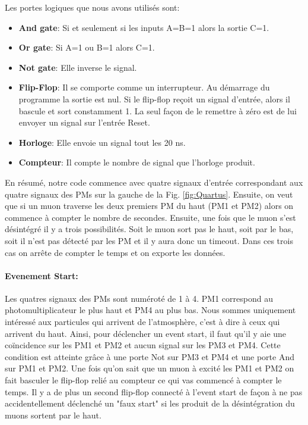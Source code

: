 \documentclass[12pt]{article}
\begin{document}
Les portes logiques que nous avons utilisés sont:
\begin{itemize}
    \item \textbf{And gate}: Si et seulement si les inputs A=B=1 alors la sortie C=1.
    \item \textbf{Or gate}: Si A=1 ou B=1 alors C=1.
    \item \textbf{Not gate}: Elle inverse le signal.
    \item \textbf{Flip-Flop}: Il se comporte comme un interrupteur. Au démarrage du programme la sortie est nul. Si le flip-flop reçoit un signal d'entrée, alors il bascule et sort constamment 1. La seul façon de le remettre à zéro est de lui envoyer un signal sur l'entrée Reset.
    \item \textbf{Horloge}: Elle envoie un signal tout les 20 ns.
    \item \textbf{Compteur}: Il compte le nombre de signal que l'horloge produit.
\end{itemize}

En résumé, notre code commence avec quatre signaux d'entrée correspondant aux quatre signaux des PMs sur la gauche de la Fig. \ref{fig:Quartus}. Ensuite, on veut que si un muon traverse les deux premiers PM du haut (PM1 et PM2) alors on commence à compter le nombre de secondes. Ensuite, une fois que le muon s'est désintégré il y a trois possibilités. Soit le muon sort pas le haut, soit par le bas, soit il n'est pas détecté par les PM et il y aura donc un timeout. Dans ces trois cas on arrête de compter le temps et on exporte les données.
\paragraph{Evenement Start:}
Les quatres signaux des PMs sont numéroté de 1 à 4. PM1 correspond au photomultiplicateur le plus haut et PM4 au plus bas. Nous sommes uniquement intéressé aux particules qui arrivent de l'atmosphère, c'est à dire à ceux qui arrivent du haut. Ainsi, pour déclencher un event start, il faut qu'il y aie une coïncidence sur les PM1 et PM2 et aucun signal sur les PM3 et PM4. Cette condition est atteinte grâce à une porte Not sur PM3 et PM4 et une porte And sur PM1 et PM2. Une fois qu'on sait que un muon à excité les PM1 et PM2 on fait basculer le flip-flop relié au compteur ce qui vas commencé à compter le temps. Il y a de plus un second flip-flop connecté à l'event start de façon à ne pas accidentellement déclenché un "faux start" si les produit de la désintégration du muons sortent par le haut.
\end{document}
